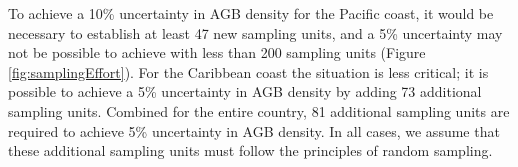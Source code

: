 \documentclass[review, authoryear]{elsarticle}   	%
\DeclareRobustCommand{\Carlos}{\todo[author=Carlos, inline, color=blue!40, size=\small]}
\begin{document}
To achieve a 10\% uncertainty in AGB density for the Pacific coast, it would be necessary to establish at least 47 new sampling units, and a 5\% uncertainty may not be possible to achieve with less than 200 sampling units (Figure \ref{fig:samplingEffort}). For the Caribbean coast the situation is less critical; it is possible to achieve a 5\% uncertainty in AGB density by adding 73 additional sampling units. Combined for the entire country, 81 additional sampling units are required to achieve 5\% uncertainty in AGB density. In all cases, we assume that these additional sampling units must follow the principles of random sampling. 



\end{document}
